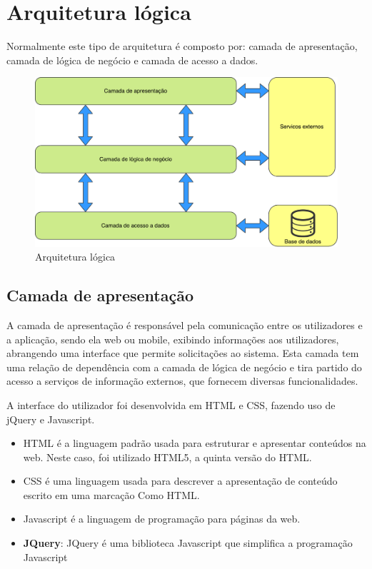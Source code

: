 \newpage
\section{Arquitetura lógica}

Normalmente este tipo de arquitetura é composto por: camada de apresentação,
camada de lógica de negócio e camada de acesso a dados.


\begin{figure}[!htb]
	\centering
	\includegraphics[width=\linewidth]{esquemas/arquitetura-logica.pdf}
	\caption{Arquitetura lógica}
	\label{opencvlogo}
\end{figure}



\subsection{Camada de apresentação}


A camada de apresentação é responsável pela comunicação entre os utilizadores e a aplicação, sendo ela web ou mobile, exibindo informações aos utilizadores, abrangendo uma interface que permite solicitações ao sistema. Esta camada tem uma relação de dependência com a camada de lógica de negócio e tira partido do acesso a serviços de informação externos, que fornecem diversas funcionalidades. 


A interface do utilizador foi desenvolvida em  \ac{HTML} e \ac{CSS}, fazendo uso de jQuery e Javascript.



\begin{itemize}
	\item \ac{HTML} é a linguagem padrão usada para estruturar e apresentar conteúdos na web. Neste caso, foi utilizado HTML5, a quinta versão do \ac{HTML}.
	\item \ac{CSS} é uma linguagem usada para descrever a apresentação de conteúdo escrito em uma marcação Como HTML.
	\item Javascript é a linguagem de programação para páginas da web.
	\item \textbf{JQuery}: JQuery é uma biblioteca Javascript que simplifica a programação Javascript
\end{itemize}









